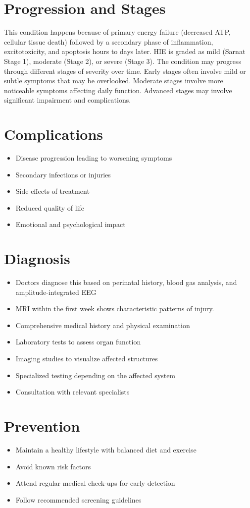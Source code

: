 \section{Progression and Stages}
This condition happens because of primary energy failure (decreased ATP, cellular tissue death) followed by a secondary phase of inflammation, excitotoxicity, and apoptosis hours to days later. HIE is graded as mild (Sarnat Stage 1), moderate (Stage 2), or severe (Stage 3). The condition may progress through different stages of severity over time. Early stages often involve mild or subtle symptoms that may be overlooked. Moderate stages involve more noticeable symptoms affecting daily function. Advanced stages may involve significant impairment and complications.
\section{Complications}
\begin{itemize}[noitemsep]
  \item Disease progression leading to worsening symptoms
  \item Secondary infections or injuries
  \item Side effects of treatment
  \item Reduced quality of life
  \item Emotional and psychological impact
\end{itemize}
\section{Diagnosis}
\begin{itemize}[noitemsep]
  \item Doctors diagnose this based on perinatal history, blood gas analysis, and amplitude-integrated EEG
  \item MRI within the first week shows characteristic patterns of injury.
  \item Comprehensive medical history and physical examination
  \item Laboratory tests to assess organ function
  \item Imaging studies to visualize affected structures
  \item Specialized testing depending on the affected system
  \item Consultation with relevant specialists
\end{itemize}
\section{Prevention}
\begin{itemize}[noitemsep]
  \item Maintain a healthy lifestyle with balanced diet and exercise
  \item Avoid known risk factors
  \item Attend regular medical check-ups for early detection
  \item Follow recommended screening guidelines
\end{itemize}

